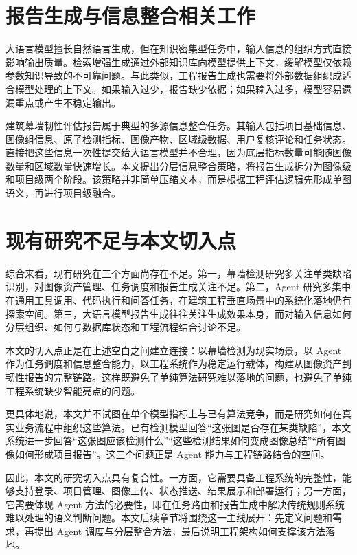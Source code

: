\section{报告生成与信息整合相关工作}
\label{sec:related-report-generation}

大语言模型擅长自然语言生成，但在知识密集型任务中，输入信息的组织方式直接影响输出质量。检索增强生成通过外部知识库向模型提供上下文，缓解模型仅依赖参数知识导致的不可靠问题\cite{lewis2020rag}。与此类似，工程报告生成也需要将外部数据组织成适合模型处理的上下文。如果输入过少，报告缺少依据；如果输入过多，模型容易遗漏重点或产生不稳定输出。

建筑幕墙韧性评估报告属于典型的多源信息整合任务。其输入包括项目基础信息、图像组信息、原子检测指标、图像产物、区域级数据、用户复核评论和任务状态。直接把这些信息一次性提交给大语言模型并不合理，因为底层指标数量可能随图像数量和区域数量快速增长。本文提出分层信息整合策略，将报告生成拆分为图像级和项目级两个阶段。该策略并非简单压缩文本，而是根据工程评估逻辑先形成单图语义，再进行项目级融合。

\section{现有研究不足与本文切入点}
\label{sec:related-gap}

综合来看，现有研究在三个方面尚存在不足。第一，幕墙检测研究多关注单类缺陷识别，对图像资产管理、任务调度和报告生成关注不足。第二，Agent 研究多集中在通用工具调用、代码执行和问答任务，在建筑工程垂直场景中的系统化落地仍有探索空间。第三，大语言模型报告生成往往关注生成效果本身，而对输入信息如何分层组织、如何与数据库状态和工程流程结合讨论不足。

本文的切入点正是在上述空白之间建立连接：以幕墙检测为现实场景，以 Agent 作为任务调度和信息整合能力，以工程系统作为稳定运行载体，构建从图像资产到韧性报告的完整链路。这样既避免了单纯算法研究难以落地的问题，也避免了单纯工程系统缺少智能亮点的问题。

更具体地说，本文并不试图在单个模型指标上与已有算法竞争，而是研究如何在真实业务流程中组织这些算法。已有检测模型回答“这张图是否存在某类缺陷”，本文系统进一步回答“这张图应该检测什么”“这些检测结果如何变成图像总结”“所有图像如何形成项目报告”。这三个问题正是 Agent 能力与工程链路结合的空间。

因此，本文的研究切入点具有复合性。一方面，它需要具备工程系统的完整性，能够支持登录、项目管理、图像上传、状态推送、结果展示和部署运行；另一方面，它需要体现 Agent 方法的必要性，即在任务路由和报告生成中解决传统规则系统难以处理的语义判断问题。本文后续章节将围绕这一主线展开：先定义问题和需求，再提出 Agent 调度与分层整合方法，最后说明工程架构如何支撑该方法落地。
